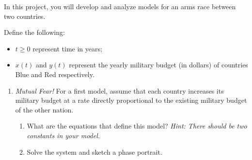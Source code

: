 In this project, you will develop and analyze models for an arms race between two countries. 

Define the following:
\begin{itemize}
	\item $t\geq 0$ represent time in years;
	\item $x(t)$ and $y(t)$ represent the yearly military budget (in dollars) of countries Blue and Red respectively. 
\end{itemize}

\vfill

\begin{enumerate}[label=\emph{\arabic*.}]
\item \emph{Mutual Fear!} 
For a first model, assume that each country increases its military budget at a rate directly proportional to the existing military budget of the other nation. 
\begin{enumerate}[label=\emph{(\alph*)}]
\item What are the equations that define this model? \emph{Hint: There should be two constants in your model.}

\item Solve the system and sketch a phase portrait.



\end{enumerate}
\end{enumerate}
